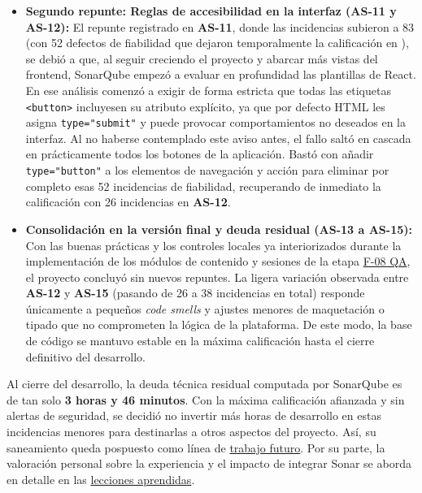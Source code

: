 \begin{itemize}
    \item \textbf{Segundo repunte: Reglas de accesibilidad en la interfaz (AS-11 y AS-12):}
    El repunte registrado en \textbf{AS-11}, donde las incidencias subieron a 83 (con 52 defectos de fiabilidad que dejaron temporalmente la calificación en   ), se debió a que, al seguir creciendo el proyecto y abarcar más vistas del frontend, SonarQube empezó a evaluar en profundidad las plantillas de React. En ese análisis comenzó a exigir de forma estricta que todas las etiquetas \texttt{<button>} incluyesen su atributo explícito, ya que por defecto HTML les asigna \texttt{type="submit"} y puede provocar comportamientos no deseados en la interfaz. Al no haberse contemplado este aviso antes, el fallo saltó en cascada en prácticamente todos los botones de la aplicación. Bastó con añadir \texttt{type="button"} a los elementos de navegación y acción para eliminar por completo esas 52 incidencias de fiabilidad, recuperando de inmediato la calificación    con 26 incidencias en \textbf{AS-12}.

    \item \textbf{Consolidación en la versión final y deuda residual (AS-13 a AS-15):}
    Con las buenas prácticas y los controles locales ya interiorizados durante la implementación de los módulos de contenido y sesiones de la etapa \hyperref[fase:qa]{F-08 QA}, el proyecto concluyó sin nuevos repuntes. La ligera variación observada entre \textbf{AS-12} y \textbf{AS-15} (pasando de 26 a 38 incidencias en total) responde únicamente a pequeños \textit{code smells} y ajustes menores de maquetación o tipado que no comprometen la lógica de la plataforma. De este modo, la base de código se mantuvo estable en la máxima calificación hasta el cierre definitivo del desarrollo.
\end{itemize}

Al cierre del desarrollo, la deuda técnica residual computada por SonarQube es de tan solo \textbf{3 horas y 46 minutos}. Con la máxima calificación afianzada y sin alertas de seguridad, se decidió no invertir más horas de desarrollo en estas incidencias menores para destinarlas a otros aspectos del proyecto. Así, su saneamiento queda pospuesto como línea de \hyperref[sec:trabajo_futuro]{trabajo futuro}. Por su parte, la valoración personal sobre la experiencia y el impacto de integrar Sonar se aborda en detalle en las \hyperref[sec:lecciones_aprendidas]{lecciones aprendidas}.
